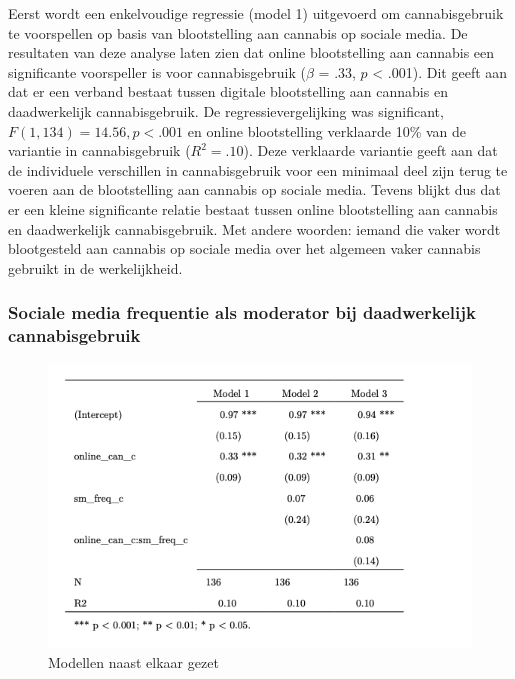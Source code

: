 \documentclass[
  letterpaper,
  DIV=11,
  numbers=noendperiod]{scrartcl}
\begin{document}
Eerst wordt een enkelvoudige regressie (model 1) uitgevoerd om
cannabisgebruik te voorspellen op basis van blootstelling aan cannabis
op sociale media. De resultaten van deze analyse laten zien dat online
blootstelling aan cannabis een significante voorspeller is voor
cannabisgebruik (\(\beta\) = .33, \(p\) \textless{} .001). Dit geeft aan
dat er een verband bestaat tussen digitale blootstelling aan cannabis en
daadwerkelijk cannabisgebruik. De regressievergelijking was significant,
\(F(1, 134) = 14.56, p <.001\) en online blootstelling verklaarde 10\%
van de variantie in cannabisgebruik (\(R^2 = .10\)). Deze verklaarde
variantie geeft aan dat de individuele verschillen in cannabisgebruik
voor een minimaal deel zijn terug te voeren aan de blootstelling aan
cannabis op sociale media. Tevens blijkt dus dat er een kleine
significante relatie bestaat tussen online blootstelling aan cannabis en
daadwerkelijk cannabisgebruik. Met andere woorden: iemand die vaker
wordt blootgesteld aan cannabis op sociale media over het algemeen vaker
cannabis gebruikt in de werkelijkheid.

\hypertarget{sociale-media-frequentie-als-moderator-bij-daadwerkelijk-cannabisgebruik}{%
\subsubsection{Sociale media frequentie als moderator bij daadwerkelijk
cannabisgebruik}\label{sociale-media-frequentie-als-moderator-bij-daadwerkelijk-cannabisgebruik}}

\begin{figure}

{\centering \includegraphics{images/Screenshot1a.png}

}

\caption{Modellen naast elkaar gezet}

\end{figure}
\end{document}
